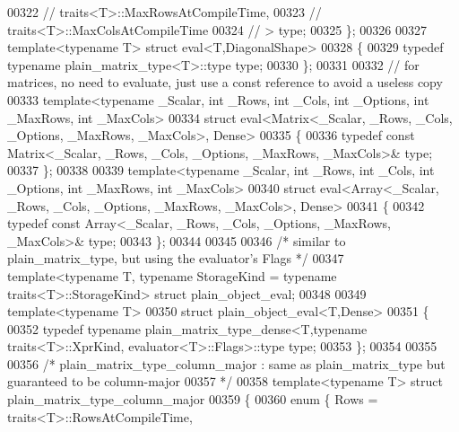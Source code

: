 \begin{DoxyCode}
{00322 \textcolor{comment}{//                 traits<T>::MaxRowsAtCompileTime,}
00323 \textcolor{comment}{//                 traits<T>::MaxColsAtCompileTime}
00324 \textcolor{comment}{//           > type;}
00325 \};
00326 
00327 \textcolor{keyword}{template}<\textcolor{keyword}{typename} T> \textcolor{keyword}{struct }eval<T,DiagonalShape>
00328 \{
00329   \textcolor{keyword}{typedef} \textcolor{keyword}{typename} plain\_matrix\_type<T>::type type;
00330 \};
00331 
00332 \textcolor{comment}{// for matrices, no need to evaluate, just use a const reference to avoid a useless copy}
00333 \textcolor{keyword}{template}<\textcolor{keyword}{typename} \_Scalar, \textcolor{keywordtype}{int} \_Rows, \textcolor{keywordtype}{int} \_Cols, \textcolor{keywordtype}{int} \_Options, \textcolor{keywordtype}{int} \_MaxRows, \textcolor{keywordtype}{int} \_MaxCols>
00334 \textcolor{keyword}{struct }eval<Matrix<\_Scalar, \_Rows, \_Cols, \_Options, \_MaxRows, \_MaxCols>, Dense>
00335 \{
00336   \textcolor{keyword}{typedef} \textcolor{keyword}{const} Matrix<\_Scalar, \_Rows, \_Cols, \_Options, \_MaxRows, \_MaxCols>& type;
00337 \};
00338 
00339 \textcolor{keyword}{template}<\textcolor{keyword}{typename} \_Scalar, \textcolor{keywordtype}{int} \_Rows, \textcolor{keywordtype}{int} \_Cols, \textcolor{keywordtype}{int} \_Options, \textcolor{keywordtype}{int} \_MaxRows, \textcolor{keywordtype}{int} \_MaxCols>
00340 \textcolor{keyword}{struct }eval<Array<\_Scalar, \_Rows, \_Cols, \_Options, \_MaxRows, \_MaxCols>, Dense>
00341 \{
00342   \textcolor{keyword}{typedef} \textcolor{keyword}{const} Array<\_Scalar, \_Rows, \_Cols, \_Options, \_MaxRows, \_MaxCols>& type;
00343 \};
00344 
00345 
00346 \textcolor{comment}{/* similar to plain\_matrix\_type, but using the evaluator's Flags */}
00347 template<typename T, typename StorageKind = typename traits<T>::StorageKind> \textcolor{keyword}{struct }plain\_object\_eval;
00348 
00349 \textcolor{keyword}{template}<\textcolor{keyword}{typename} T>
00350 \textcolor{keyword}{struct }plain\_object\_eval<T,Dense>
00351 \{
00352   \textcolor{keyword}{typedef} \textcolor{keyword}{typename} plain\_matrix\_type\_dense<T,typename traits<T>::XprKind, evaluator<T>::Flags>::type type;
00353 \};
00354 
00355 
00356 \textcolor{comment}{/* plain\_matrix\_type\_column\_major : same as plain\_matrix\_type but guaranteed to be column-major}
00357 \textcolor{comment}{ */}
00358 \textcolor{keyword}{template}<\textcolor{keyword}{typename} T> \textcolor{keyword}{struct }plain\_matrix\_type\_column\_major
00359 \{
00360   \textcolor{keyword}{enum} \{ Rows = traits<T>::RowsAtCompileTime,
}
\end{DoxyCode}
